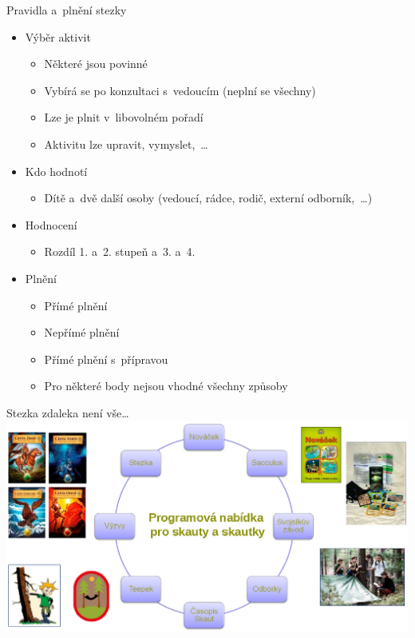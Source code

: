 \documentclass[hyperref={bookmarks=true, unicode=true, colorlinks=true, plainpages=false, pdfkeywords={Skaut, Junak, Skauting, Vychovna metoda}, linkcolor=OrangeRed, anchorcolor=OrangeRed, citecolor=RawSienna, filecolor=RawSienna, menucolor=OrangeRed, urlcolor=RawSienna, pdftex}, compress, xelatex, xcolor=dvipsnames, print]{beamer}
\begin{document}
\begin{frame}{Pravidla a~plnění stezky}
\begin{itemize}
\item Výběr aktivit
 \begin{itemize}
 \item Některé jsou povinné
 \item Vybírá se po konzultaci s~vedoucím (neplní se všechny)
 \item Lze je plnit v~libovolném pořadí
 \item Aktivitu lze upravit, vymyslet,~\ldots
 \end{itemize}
\item Kdo hodnotí
 \begin{itemize}
 \item Dítě a~dvě další osoby (vedoucí, rádce, rodič, externí odborník,~\ldots)
 \end{itemize}
\item Hodnocení
 \begin{itemize}
 \item Rozdíl 1. a~2. stupeň a~3. a~4.
 \end{itemize}
\item Plnění
 \begin{itemize}
 \item Přímé plnění
 \item Nepřímé plnění
 \item Přímé plnění s~přípravou
 \item Pro některé body nejsou vhodné všechny způsoby
 \end{itemize}
\end{itemize}
\end{frame}

\begin{frame}{Stezka zdaleka není vše\ldots}
\includegraphics[width=\textwidth]{komplet.png}
\end{frame}
\end{document}
